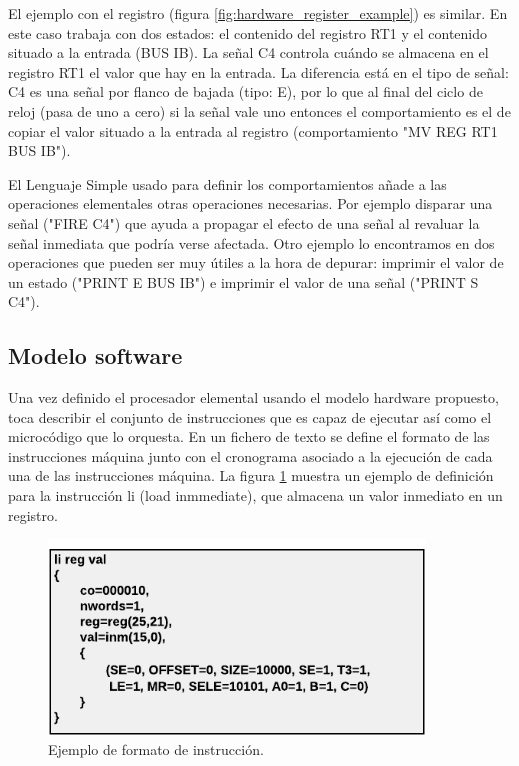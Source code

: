 El ejemplo con el registro (figura \ref{fig:hardware_register_example}) es similar. En este caso trabaja con dos estados: el contenido del registro RT1 y el contenido situado a la entrada (BUS IB). La señal C4 controla cuándo se almacena en el registro RT1 el valor que hay en la entrada. La diferencia está en el tipo de señal: C4 es una señal por flanco de bajada (tipo: E), por lo que al final del ciclo de reloj (pasa de uno a cero) si la señal vale uno entonces el comportamiento es el de copiar el valor situado a la entrada al registro (comportamiento "MV REG RT1 BUS IB").

El Lenguaje Simple usado para definir los comportamientos añade a las operaciones elementales otras operaciones necesarias. Por ejemplo disparar una señal ("FIRE C4") que ayuda a propagar el efecto de una señal al revaluar la señal inmediata que podría verse afectada. Otro ejemplo lo encontramos en dos operaciones que pueden ser muy útiles a la hora de depurar: imprimir el valor de un estado ("PRINT E BUS IB") e imprimir el valor de una señal ("PRINT S C4").

\subsection{Modelo software}

Una vez definido el procesador elemental usando el modelo hardware propuesto, toca describir el conjunto de instrucciones que es capaz de ejecutar así como el microcódigo que lo orquesta. En un fichero de texto se define el formato de las instrucciones máquina junto con el cronograma asociado a la ejecución de cada una de las instrucciones máquina. La figura \ref{fig:software_format_example} muestra un ejemplo de definición para la instrucción li (load inmmediate), que almacena un valor inmediato en un registro.

\begin{figure}[htbp]
 	\centering
 	\includegraphics[width=10cm]{figures/instruction_example}
 	\caption{Ejemplo de formato de instrucción.}
	\label{fig:software_format_example}
\end{figure}

